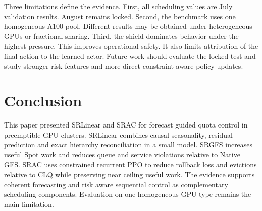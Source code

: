 \documentclass[conference]{IEEEtran}
\begin{document}
Three limitations define the evidence. First, all scheduling values are July validation results. August remains locked. Second, the benchmark uses one homogeneous A100 pool. Different results may be obtained under heterogeneous GPUs or fractional sharing. Third, the shield dominates behavior under the highest pressure. This improves operational safety. It also limits attribution of the final action to the learned actor. Future work should evaluate the locked test and study stronger risk features and more direct constraint aware policy updates.

\section{Conclusion}
This paper presented SRLinear and SRAC for forecast guided quota control in preemptible GPU clusters. SRLinear combines causal seasonality, residual prediction and exact hierarchy reconciliation in a small model. SRGFS increases useful Spot work and reduces queue and service violations relative to Native GFS. SRAC uses constrained recurrent PPO to reduce rollback loss and evictions relative to CLQ while preserving near ceiling useful work. The evidence supports coherent forecasting and risk aware sequential control as complementary scheduling components. Evaluation on one homogeneous GPU type remains the main limitation.
\end{document}

